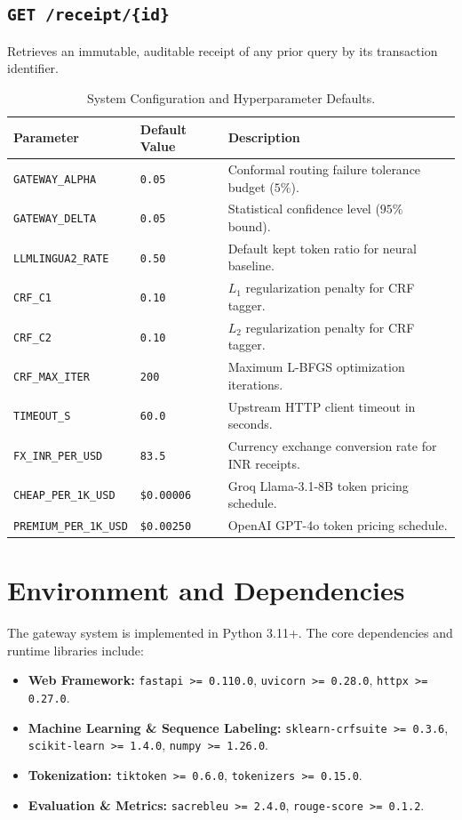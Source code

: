 \subsection{\texttt{GET /receipt/\{id\}}}
Retrieves an immutable, auditable receipt of any prior query by its transaction identifier.

\begin{table}[htbp]
\centering
\small
\caption{System Configuration and Hyperparameter Defaults.}
\label{tab:hyperparameters}
\begin{tabular}{lll}
\toprule
\textbf{Parameter} & \textbf{Default Value} & \textbf{Description} \\
\midrule
\texttt{GATEWAY\_ALPHA} & \texttt{0.05} & Conformal routing failure tolerance budget ($5\%$). \\
\texttt{GATEWAY\_DELTA} & \texttt{0.05} & Statistical confidence level ($95\%$ bound). \\
\texttt{LLMLINGUA2\_RATE} & \texttt{0.50} & Default kept token ratio for neural baseline. \\
\texttt{CRF\_C1} & \texttt{0.10} & $L_1$ regularization penalty for CRF tagger. \\
\texttt{CRF\_C2} & \texttt{0.10} & $L_2$ regularization penalty for CRF tagger. \\
\texttt{CRF\_MAX\_ITER} & \texttt{200} & Maximum L-BFGS optimization iterations. \\
\texttt{TIMEOUT\_S} & \texttt{60.0} & Upstream HTTP client timeout in seconds. \\
\texttt{FX\_INR\_PER\_USD} & \texttt{83.5} & Currency exchange conversion rate for INR receipts. \\
\texttt{CHEAP\_PER\_1K\_USD} & \texttt{\$0.00006} & Groq Llama-3.1-8B token pricing schedule. \\
\texttt{PREMIUM\_PER\_1K\_USD} & \texttt{\$0.00250} & OpenAI GPT-4o token pricing schedule. \\
\bottomrule
\end{tabular}
\end{table}

\section{Environment and Dependencies}
The gateway system is implemented in Python 3.11+. The core dependencies and runtime libraries include:
\begin{itemize}
    \item \textbf{Web Framework:} \texttt{fastapi >= 0.110.0}, \texttt{uvicorn >= 0.28.0}, \texttt{httpx >= 0.27.0}.
    \item \textbf{Machine Learning \& Sequence Labeling:} \texttt{sklearn-crfsuite >= 0.3.6}, \texttt{scikit-learn >= 1.4.0}, \texttt{numpy >= 1.26.0}.
    \item \textbf{Tokenization:} \texttt{tiktoken >= 0.6.0}, \texttt{tokenizers >= 0.15.0}.
    \item \textbf{Evaluation \& Metrics:} \texttt{sacrebleu >= 2.4.0}, \texttt{rouge-score >= 0.1.2}.
\end{itemize}
